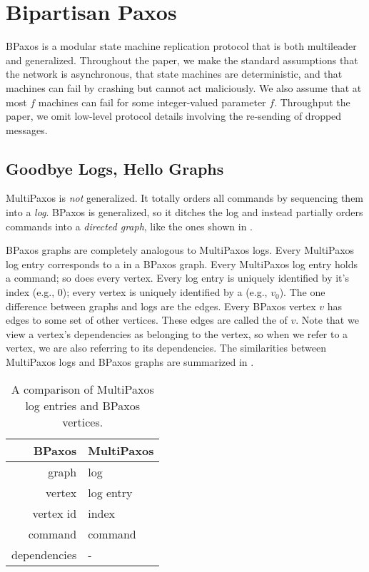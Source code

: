 \section{Bipartisan Paxos}
BPaxos is a modular state machine replication protocol that is both multileader
and generalized. Throughout the paper, we make the standard assumptions that
the network is asynchronous, that state machines are deterministic, and that
machines can fail by crashing but cannot act maliciously. We also assume that
at most $f$ machines can fail for some integer-valued parameter $f$. Throughput
the paper, we omit low-level protocol details involving the re-sending of
dropped messages.

\subsection{Goodbye Logs, Hello Graphs}
MultiPaxos is \emph{not} generalized. It totally orders all commands by
sequencing them into a \emph{log}. BPaxos is generalized, so it ditches the log
and instead partially orders commands into a \emph{directed graph}, like the
ones shown in .

BPaxos graphs are completely analogous to MultiPaxos logs. Every MultiPaxos log
entry corresponds to a  in a BPaxos graph. Every MultiPaxos log
entry holds a command; so does every vertex. Every log entry is uniquely
identified by it's index (e.g., \textcolor{flatred}{$0$}); every vertex is
uniquely identified by a  (e.g.,
\textcolor{flatred}{$v_0$}). The one difference between graphs and logs are the
edges. Every BPaxos vertex $v$ has edges to some set of other vertices. These
edges are called the  of $v$. Note that we view a
vertex's dependencies as belonging to the vertex, so when we refer to a vertex,
we are also referring to its dependencies. The similarities between MultiPaxos
logs and BPaxos graphs are summarized in .

\begin{table}[ht]
  \centering
  \caption{A comparison of MultiPaxos log entries and BPaxos vertices.}
  \begin{tabular}{r|l}
    \textbf{BPaxos} & \textbf{MultiPaxos} \\\hline
    graph           & log \\
    vertex          & log entry \\
    vertex id       & index \\
    command         & command \\
    dependencies    & - \\
  \end{tabular}
\end{table}

